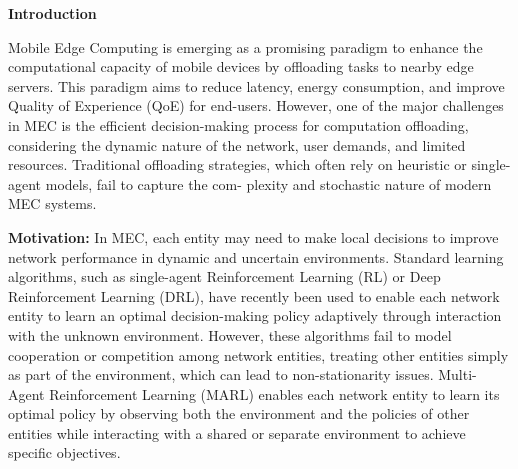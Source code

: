 \documentclass[12pt]{article}
\begin{document}
\noindent\large\textbf{Introduction}

\vspace{1.5mm}
\normalsize

Mobile Edge Computing is emerging as a promising paradigm to enhance the computational capacity of mobile devices by offloading tasks to nearby edge servers. This paradigm aims to reduce latency, energy consumption, and improve Quality of Experience (QoE) for end-users. However, one of the major challenges in MEC is the efficient decision-making process for computation offloading, considering the dynamic nature of the network, user demands, and limited resources. Traditional offloading strategies, which often rely on heuristic or single-agent models, fail to capture the com- plexity and stochastic nature of modern MEC systems. 

\small
\newpage

\noindent\textbf{\large Motivation:  }
\noindent
In MEC, each entity may need to make local decisions to improve network performance in dynamic and uncertain environments. Standard learning algorithms, such as single-agent Reinforcement Learning (RL) or Deep Reinforcement Learning (DRL), have recently been used to enable each network entity to learn an optimal decision-making policy adaptively through interaction with the unknown environment. However, these algorithms fail to model cooperation or competition among network entities, treating other entities simply as part of the environment, which can lead to non-stationarity issues. Multi-Agent Reinforcement Learning (MARL) enables each network entity to learn its optimal policy by observing both the environment and the policies of other entities while interacting with a shared or separate environment to achieve specific objectives.



\end{document}
